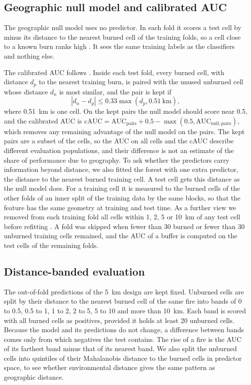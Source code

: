\documentclass[preprint,12pt,authoryear]{elsarticle}
\begin{document}
\subsection{Geographic null model and calibrated AUC}
\label{sec:null}

The geographic null model uses no predictor. In each fold it scores a test cell by minus its distance to the nearest burned cell of the training folds, so a cell close to a known burn ranks high \citep{Hijmans2012}. It sees the same training labels as the classifiers and nothing else.

The calibrated AUC follows \citet{Hijmans2012}. Inside each test fold, every burned cell, with distance $d_p$ to the nearest training burn, is paired with the unused unburned cell whose distance $d_n$ is most similar, and the pair is kept if
\begin{equation}
|d_n - d_p| \le 0.33 \max(d_p, 0.51\ \mathrm{km}),
\end{equation}
where 0.51~km is one cell. On the kept pairs the null model should score near 0.5, and the calibrated AUC is $\mathrm{cAUC} = \mathrm{AUC}_\mathrm{pairs} + 0.5 - \max(0.5, \mathrm{AUC}_\mathrm{null,pairs})$, which removes any remaining advantage of the null model on the pairs. The kept pairs are a subset of the cells, so the AUC on all cells and the cAUC describe different evaluation populations, and their difference is not an estimate of the share of performance due to geography. To ask whether the predictors carry information beyond distance, we also fitted the forest with one extra predictor, the distance to the nearest burned training cell. A test cell gets this distance as the null model does. For a training cell it is measured to the burned cells of the other folds of an inner split of the training data by the same blocks, so that the feature has the same geometry at training and test time. As a further view we removed from each training fold all cells within 1, 2, 5 or 10~km of any test cell before refitting \citep{Ploton2020}. A fold was skipped when fewer than 30 burned or fewer than 30 unburned training cells remained, and the AUC of a buffer is computed on the test cells of the remaining folds.

\subsection{Distance-banded evaluation}
\label{sec:bands}

The out-of-fold predictions of the 5~km design are kept fixed. Unburned cells are split by their distance to the nearest burned cell of the same fire into bands of 0 to 0.5, 0.5 to 1, 1 to 2, 2 to 5, 5 to 10 and more than 10~km. Each band is scored with all burned cells as positives, provided it holds at least 20 unburned cells. Because the model and its predictions do not change, a difference between bands comes only from which negatives the test contains. The rise of a fire is the AUC of its farthest band minus that of its nearest band. We also split the unburned cells into quintiles of their Mahalanobis distance to the burned cells in predictor space, to see whether environmental distance gives the same pattern as geographic distance.
\end{document}

